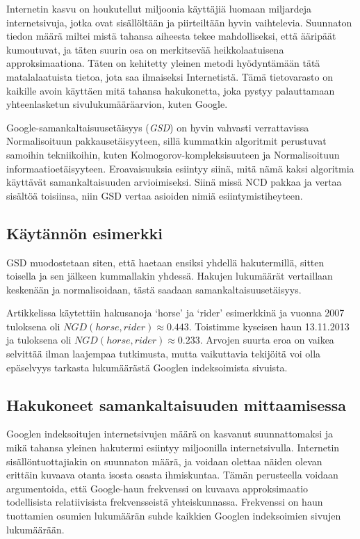 \documentclass[12pt,finnish,final]{tktltiki2}
\theoremstyle{definition}
\theoremstyle{remark}
\begin{document}
    Internetin kasvu on houkutellut miljoonia käyttäjiä luomaan miljardeja internetsivuja, jotka ovat sisällöltään ja piirteiltään hyvin vaihtelevia.
    Suunnaton tiedon määrä miltei mistä tahansa aiheesta tekee mahdolliseksi, että ääripäät kumoutuvat, ja täten suurin osa on merkitsevää heikkolaatuisena approksimaationa.
    Täten on kehitetty yleinen metodi hyödyntämään tätä matalalaatuista tietoa, jota saa ilmaiseksi Internetistä.
    Tämä tietovarasto on kaikille avoin käyttäen mitä tahansa hakukonetta, joka pystyy palauttamaan yhteenlasketun sivulukumääräarvion, kuten Google.

    Google-samankaltaisuusetäisyys (\emph{GSD}) on hyvin vahvasti verrattavissa Normalisoituun pakkausetäisyyteen, sillä kummatkin algoritmit perustuvat samoihin tekniikoihin, kuten Kolmogorov-kompleksisuuteen ja Normalisoituun informaatioetäisyyteen.
    Eroavaisuuksia esiintyy siinä, mitä nämä kaksi algoritmia käyttävät samankaltaisuuden arvioimiseksi.
    Siinä missä NCD pakkaa ja vertaa sisältöä toisiinsa, niin GSD vertaa asioiden nimiä esiintymistiheyteen. \cite{cilibrasi2007google}

    \subsection{Käytännön esimerkki} %
    \label{sub:kaytannon_esimerkki}
      GSD muodostetaan siten, että haetaan ensiksi yhdellä hakutermillä, sitten toisella ja sen jälkeen kummallakin yhdessä.
      Hakujen lukumäärät vertaillaan keskenään ja normalisoidaan, tästä saadaan samankaltaisuusetäisyys.

      Artikkelissa \cite{cilibrasi2007google} käytettiin hakusanoja `horse' ja `rider' esimerkkinä ja vuonna 2007 tuloksena oli $NGD(horse, rider) \approx 0.443$.
      Toistimme kyseisen haun 13.11.2013 ja tuloksena oli $NGD(horse, rider) \approx 0.233$.
      Arvojen suurta eroa on vaikea selvittää ilman laajempaa tutkimusta, mutta vaikuttavia tekijöitä voi olla epäselvyys tarkasta lukumäärästä Googlen indeksoimista sivuista.


    \subsection{Hakukoneet samankaltaisuuden mittaamisessa} %
    \label{sub:hakukoneet_samankaltaisuuden_mittaamisessa}

    Googlen indeksoitujen internetsivujen määrä on kasvanut suunnattomaksi ja mikä tahansa yleinen hakutermi esiintyy miljoonilla internetsivulla. Internetin sisällöntuottajiakin on suunnaton määrä, ja voidaan olettaa näiden olevan erittäin kuvaava otanta isosta osasta ihmiskuntaa.
    Tämän perusteella voidaan argumentoida, että Google-haun frekvenssi on kuvaava approksimaatio todellisista relatiivisista frekvensseistä yhteiskunnassa.
    Frekvenssi on haun tuottamien osumien lukumäärän suhde kaikkien Googlen indeksoimien sivujen lukumäärään. \cite{cilibrasi2007google}
\end{document}
